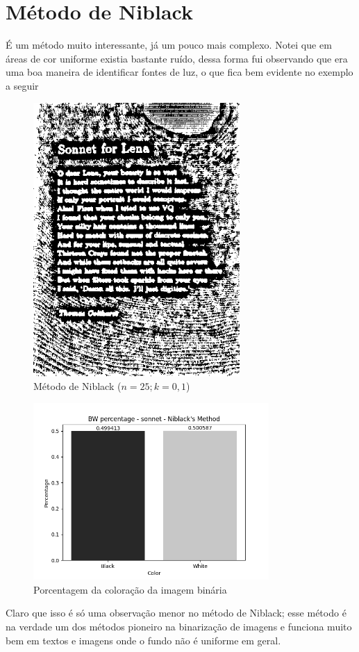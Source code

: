 \documentclass[12pt, letterpaper]{article}
\begin{document}
\section{Método de Niblack}
    É um método muito interessante, já um pouco mais complexo. Notei que em áreas de cor uniforme existia bastante ruído, dessa forma fui observando que era uma boa maneira de identificar fontes de luz, o que fica bem evidente no exemplo a seguir
    \begin{figure}[H]
        \centering
        \includegraphics[width=0.7\textwidth]{niblack_sonnet.png}
        \\{Método de Niblack ($n = 25; k = 0,1$)}
    \end{figure}
    \begin{figure}[H]
        \centering
        \includegraphics[width=0.8\textwidth]{niblack_sonnet_bw_percentage.png}
        \\{Porcentagem da coloração da imagem binária}
    \end{figure}
    Claro que isso é só uma observação menor no método de Niblack; esse método é na verdade um dos métodos pioneiro na binarização de imagens e funciona muito bem em textos e imagens onde o fundo não é uniforme em geral.
\end{document}
